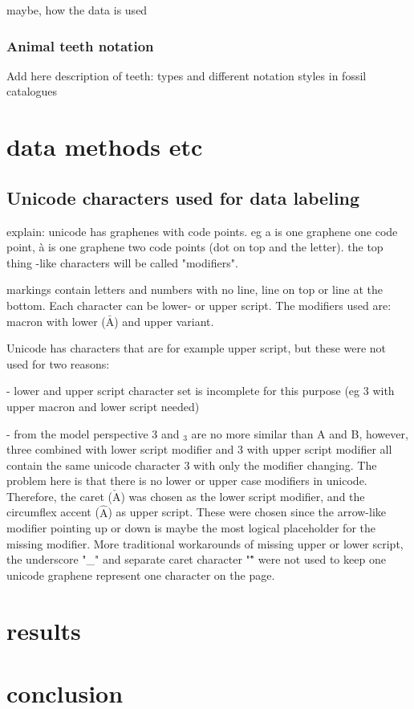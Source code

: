 \documentclass{article}
\begin{document}
maybe, how the data is used

\subsubsection{Animal teeth notation}

Add here description of teeth: types and different notation styles in fossil catalogues

\section{data methods etc}

\subsection{Unicode characters used for data labeling}

explain: unicode has graphenes with code points. eg a is one graphene one code point,
à is one graphene two code points (dot on top and the letter). the top thing -like characters will be called 
"modifiers".

markings contain letters and numbers with no line, line on top or line at the bottom.
Each character can be lower- or upper script. The modifiers used are: 
macron with lower ($\bar{\mathrm{A}}$) and upper variant.

Unicode \cite{unicode_homepage} has characters that are for example upper script, but 
these were not used for two reasons:

- lower and upper script character set is incomplete for this purpose (eg 3 with upper macron and lower script needed)

- from the model perspective 3 and $_3$ are no more similar than A and B, however, 
three combined with lower script modifier and 3 with upper script modifier 
all contain the same unicode character 3 with only the modifier changing. The 
problem here is that there is no lower or upper case modifiers in unicode. Therefore,
the caret ($\check{\mathrm{A}}$) was chosen as the lower script modifier, and the circumflex accent ($\hat{\mathrm{A}}$)
as upper script. These were chosen since the arrow-like modifier pointing up or down
is maybe the most logical placeholder for the missing modifier. More traditional 
workarounds of missing upper or lower script, the underscore "\_" and separate 
caret character "\^ " were not used to keep one unicode graphene represent one character 
on the page.

\section{results}

\section{conclusion}

\printbibliography
\end{document}
